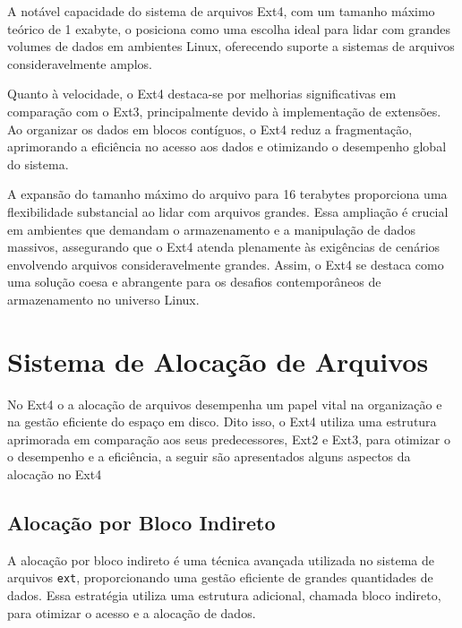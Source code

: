 \documentclass[
	12pt,				%
	openright,			%
	oneside,			%
	a4paper,			%
	chapter=TITLE,		%
	english,			%
	french,				%
	spanish,			%
	brazil				%
	]{abntex2}
\theoremstyle{definition}
\begin{document}
A notável capacidade do sistema de arquivos Ext4, com um tamanho máximo teórico de 1 exabyte, o posiciona como uma escolha ideal para lidar com grandes volumes de dados em ambientes Linux, oferecendo suporte a sistemas de arquivos consideravelmente amplos.

Quanto à velocidade, o Ext4 destaca-se por melhorias significativas em comparação com o Ext3, principalmente devido à implementação de extensões. Ao organizar os dados em blocos contíguos, o Ext4 reduz a fragmentação, aprimorando a eficiência no acesso aos dados e otimizando o desempenho global do sistema.

A expansão do tamanho máximo do arquivo para 16 terabytes proporciona uma flexibilidade substancial ao lidar com arquivos grandes. Essa ampliação é crucial em ambientes que demandam o armazenamento e a manipulação de dados massivos, assegurando que o Ext4 atenda plenamente às exigências de cenários envolvendo arquivos consideravelmente grandes. Assim, o Ext4 se destaca como uma solução coesa e abrangente para os desafios contemporâneos de armazenamento no universo Linux.

\chapter{Sistema de Alocação de Arquivos}
No Ext4 o a alocação de arquivos desempenha um papel vital na organização e na gestão eficiente do espaço em disco. 
Dito isso, o Ext4 utiliza uma estrutura aprimorada em comparação aos seus predecessores, Ext2 e Ext3, para otimizar o 
o desempenho e a eficiência, a seguir são apresentados alguns aspectos da alocação no Ext4


\section{Alocação por Bloco Indireto}
A alocação por bloco indireto é uma técnica avançada utilizada no sistema de arquivos \texttt{ext}, 
proporcionando uma gestão eficiente de grandes quantidades de dados. Essa estratégia utiliza uma 
estrutura adicional, chamada bloco indireto, para otimizar o acesso e a alocação de dados.
\end{document}
